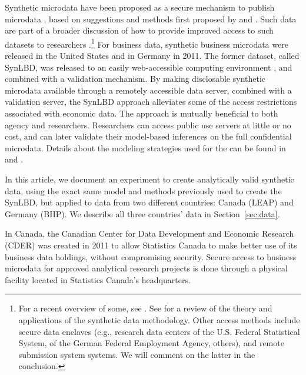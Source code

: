 Synthetic microdata have been proposed as a secure mechanism to publish microdata \citep{drechsler2008,RePEc:taf:japsta:v:39:y:2012:i:2:p:243-265,NAP11844,SJIAOS-2014c}, based on suggestions and methods first proposed by \citet{rubin93} and \citet{little93}. Such data are  part of a broader discussion of how  to provide improved access to such datasets to researchers  \citep{Bender2009,Vilhuber2013,AbowdLane2004,AbowdSchmutte_BPEA2015}.\footnote{
	For a recent overview of some, see \citet{VilhuberAbowdReiter:Synthetic:SJIAOS:2016}. See \citet{dre:2011} for a review of the theory and applications of the synthetic data methodology.
	Other access methods include secure data enclaves (e.g., research data centers of the U.S. Federal Statistical System, of the  German Federal Employment Agency, others), and  remote submission system systems. We will comment on the latter in the conclusion.  }
For business data, synthetic business microdata were released in the United States \citep{KinneyEtAl2011} and in Germany  \citep{RePEc:iab:iabfme:201101_de} in 2011. The former dataset, called \ac{SynLBD}, was  released to an easily web-accessible computing environment \citep{AbowdVilhuber2010}, and combined with a validation mechanism.  By making disclosable synthetic microdata available through a remotely accessible data server, combined with a validation server, the SynLBD approach alleviates some of the access restrictions associated with economic data. The approach is mutually beneficial to both agency and researchers. Researchers can access public use servers at little or no cost, and can later validate their model-based inferences on the full confidential microdata. Details about the modeling strategies used for the \SynLBD can be found in  %
\citet{KinneyEtAl2011} 
and \citet{RePEc:cen:tnotes:11-01}.


In this article, we document an experiment to create analytically valid synthetic data, using the exact same model and methods previously used to create the \ac{SynLBD}, but applied to data from two different countries: Canada (\ac{LEAP}) and Germany (\ac{BHP}). We describe all three countries' data in Section~\ref{sec:data}. 


In Canada, the Canadian Center for Data Development and Economic Research (CDER) was created in 2011 to allow Statistics Canada to make better use of its business data holdings, without compromising security. Secure access  to business microdata for approved analytical research projects is done through a physical facility located in Statistics Canada’s headquarters. 


